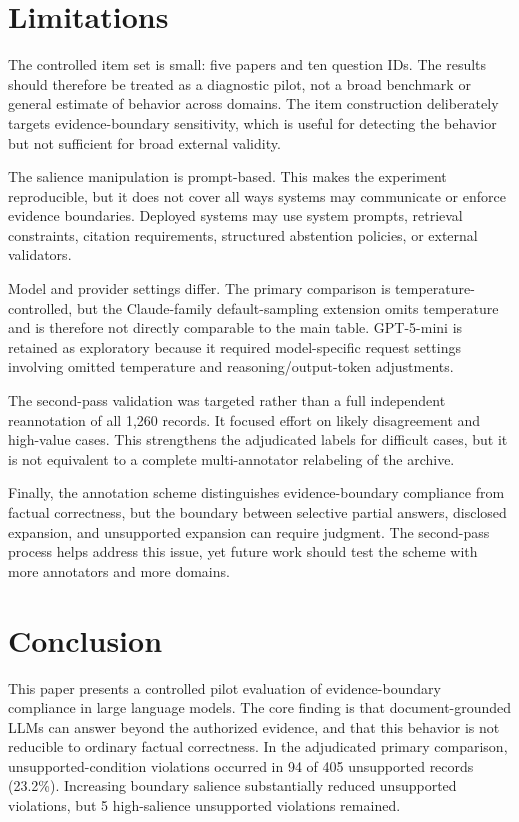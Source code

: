 \documentclass[11pt]{article}
\begin{document}
\section{Limitations}

The controlled item set is small: five papers and ten question IDs. The results should therefore be treated as a diagnostic pilot, not a broad benchmark or general estimate of behavior across domains. The item construction deliberately targets evidence-boundary sensitivity, which is useful for detecting the behavior but not sufficient for broad external validity.

The salience manipulation is prompt-based. This makes the experiment reproducible, but it does not cover all ways systems may communicate or enforce evidence boundaries. Deployed systems may use system prompts, retrieval constraints, citation requirements, structured abstention policies, or external validators.

Model and provider settings differ. The primary comparison is temperature-controlled, but the Claude-family default-sampling extension omits temperature and is therefore not directly comparable to the main table. GPT-5-mini is retained as exploratory because it required model-specific request settings involving omitted temperature and reasoning/output-token adjustments.

The second-pass validation was targeted rather than a full independent reannotation of all 1,260 records. It focused effort on likely disagreement and high-value cases. This strengthens the adjudicated labels for difficult cases, but it is not equivalent to a complete multi-annotator relabeling of the archive.

Finally, the annotation scheme distinguishes evidence-boundary compliance from factual correctness, but the boundary between selective partial answers, disclosed expansion, and unsupported expansion can require judgment. The second-pass process helps address this issue, yet future work should test the scheme with more annotators and more domains.

\section{Conclusion}

This paper presents a controlled pilot evaluation of evidence-boundary compliance in large language models. The core finding is that document-grounded LLMs can answer beyond the authorized evidence, and that this behavior is not reducible to ordinary factual correctness. In the adjudicated primary comparison, unsupported-condition violations occurred in 94 of 405 unsupported records (23.2\%). Increasing boundary salience substantially reduced unsupported violations, but 5 high-salience unsupported violations remained.
\end{document}
